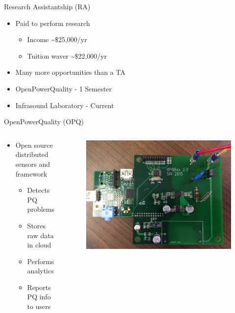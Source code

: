 \documentclass{beamer}
\begin{document}
\begin{frame}{Research Assistantship (RA)}
\begin{itemize}
	\item Paid to perform research 
	\begin{itemize}
		\item Income \textasciitilde\$25,000/yr
		\item Tuition waver \textasciitilde\$22,000/yr
	\end{itemize}
	\item Many more opportunities than a TA
	\item OpenPowerQuality - 1 Semester
	\item Infrasound Laboratory - Current
\end{itemize}
\end{frame}

\begin{frame}{OpenPowerQuality (OPQ)}
	\begin{columns}
		\begin{column}{.50\textwidth}
			\begin{itemize}
				\item Open source distributed sensors and framework
				\begin{itemize}
					\item Detects PQ problems
					\item Stores raw data in cloud
					\item Performs analytics
					\item Reports PQ info to users
				\end{itemize}
			\end{itemize}
		\end{column}
		\begin{column}{.50\textwidth}
			\begin{figure}
				\includegraphics[width=\linewidth]{img/box.JPG}
			\end{figure}
		\end{column}
	\end{columns}
\end{frame}
\end{document}
